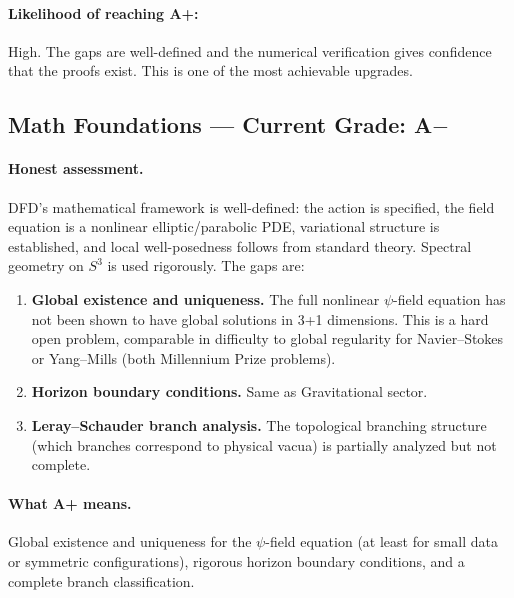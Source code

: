 \documentclass[11pt,a4paper]{article}
\begin{document}
\paragraph{Likelihood of reaching A+:} \textcolor{gradeA}{High}. The gaps are well-defined and the numerical verification gives confidence that the proofs exist. This is one of the most achievable upgrades.

\subsection{Math Foundations --- Current Grade: A$-$}

\paragraph{Honest assessment.}
DFD's mathematical framework is well-defined: the action is specified, the field equation is a nonlinear elliptic/parabolic PDE, variational structure is established, and local well-posedness follows from standard theory. Spectral geometry on $S^3$ is used rigorously. The gaps are:
\begin{enumerate}[label=(\alph*)]
    \item \textbf{Global existence and uniqueness.} The full nonlinear $\psi$-field equation has not been shown to have global solutions in 3+1 dimensions. This is a hard open problem, comparable in difficulty to global regularity for Navier--Stokes or Yang--Mills (both Millennium Prize problems).
    \item \textbf{Horizon boundary conditions.} Same as Gravitational sector.
    \item \textbf{Leray--Schauder branch analysis.} The topological branching structure (which branches correspond to physical vacua) is partially analyzed but not complete.
\end{enumerate}

\paragraph{What A+ means.}
Global existence and uniqueness for the $\psi$-field equation (at least for small data or symmetric configurations), rigorous horizon boundary conditions, and a complete branch classification.
\end{document}

